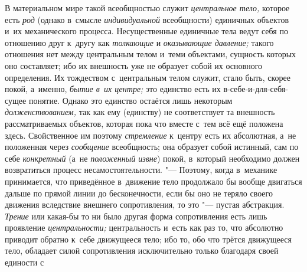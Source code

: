 В материальном мире такой всеобщностью служит
{\em центральное тело,}
которое есть {\em род}
(однако в~смысле
{\em индивидуальной}
всеобщности) единичных объектов и~их механического процесса.
Несущественные единичные тела ведут себя по отношению друг к~другу как
{\em толкающие} и
{\em оказывающие давление;}
такого отношения нет между центральным телом и~теми
объектами, сущность которых оно составляет; ибо их внешность уже не
образует собой их основного определения. Их тождеством с~центральным телом
служит, стало быть, скорее покой, а~именно,
{\em бытие в~их центре;}
это единство есть их в-себе-и-для-себя-сущее понятие. Однако
это единство остаётся лишь некоторым
{\em долженствованием,}
так как ему (единству) не соответствует та внешность
рассматриваемых объектов, которая пока что вместе с~тем всё ещё положена
здесь. Свойственное им поэтому
{\em стремление} к~центру
есть их абсолютная, а~не положенная через
{\em сообщение}
всеобщность; она образует собой истинный, сам по себе
{\em конкретный} (а~не
{\em положенный извне})
покой, в~который необходимо должен возвратиться процесс
несамостоятельности. "--- Поэтому, когда в~механике
принимается, что приведённое в~движение тело продолжало бы вообще двигаться
дальше по прямой линии до бесконечности, если бы оно не теряло своего
движения вследствие внешнего сопротивления, то это "--- пустая
абстракция. {\em Трение}
или какая-бы то ни было другая форма
сопротивления есть лишь проявление
{\em центральности;}
центральность и~есть как раз то, что абсолютно приводит
обратно к~себе движущееся тело; ибо то, обо что трётся движущееся тело,
обладает силой сопротивления исключительно только благодаря своей единости
с
